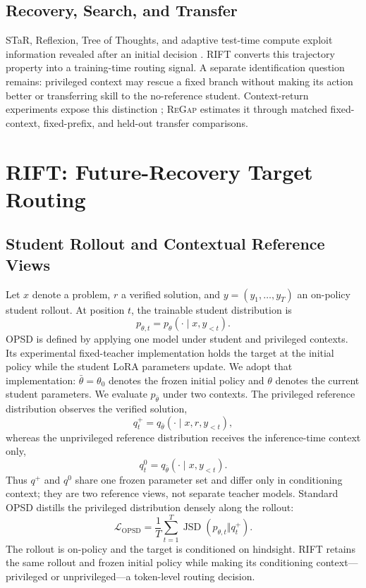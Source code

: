 \documentclass[letterpaper]{article}
\newcommand{\RIFT}{\textsc{RIFT}}
\newcommand{\ReGap}{\textsc{ReGap}}
\newcommand{\JSD}{\operatorname{JSD}}
\begin{document}
\subsection{Recovery, Search, and Transfer}

STaR, Reflexion, Tree of Thoughts, and adaptive test-time compute exploit
information revealed after an initial decision
\citep{zelikman2022star,shinn2023reflexion,yao2023tree,snell2024scaling}.
\RIFT{} converts this trajectory property into a training-time routing signal.
A separate identification question remains: privileged context may rescue a
fixed branch without making its action better or transferring skill to the
no-reference student. Context-return experiments expose this distinction
\citep{wang2026context}; \ReGap{} estimates it through matched fixed-context,
fixed-prefix, and held-out transfer comparisons.

\section{RIFT: Future-Recovery Target Routing}
\label{sec:rift}

\subsection{Student Rollout and Contextual Reference Views}

Let $x$ denote a problem, $r$ a verified solution, and
$y=(y_1,\ldots,y_T)$ an on-policy student rollout. At position $t$, the
trainable student distribution is
\begin{equation}
p_{\theta,t}=p_\theta(\cdot\mid x,y_{<t}).
\end{equation}
OPSD is defined by applying one model under student and privileged contexts.
Its experimental fixed-teacher implementation holds the target at the initial
policy while the student LoRA parameters update. We adopt that implementation:
$\bar\theta=\theta_0$ denotes the frozen initial policy and $\theta$ denotes the
current student parameters. We evaluate $p_{\bar\theta}$ under two contexts.
The privileged reference distribution observes the verified solution,
\begin{equation}
q^+_t=q_{\bar\theta}(\cdot\mid x,r,y_{<t}),
\end{equation}
whereas the unprivileged reference distribution receives the inference-time
context only,
\begin{equation}
q^0_t=q_{\bar\theta}(\cdot\mid x,y_{<t}).
\end{equation}
Thus $q^+$ and $q^0$ share one frozen parameter set and differ only in
conditioning context; they are two reference views, not separate teacher
models.
Standard OPSD distills the privileged distribution densely along the rollout:
\begin{equation}
\mathcal L_{\mathrm{OPSD}}
=\frac{1}{T}\sum_{t=1}^{T}\JSD(p_{\theta,t}\Vert q^+_t).
\label{eq:opsd}
\end{equation}
The rollout is on-policy and the target is conditioned on hindsight. \RIFT{}
retains the same rollout and frozen initial policy while making its conditioning
context---privileged or unprivileged---a token-level routing decision.
\end{document}
